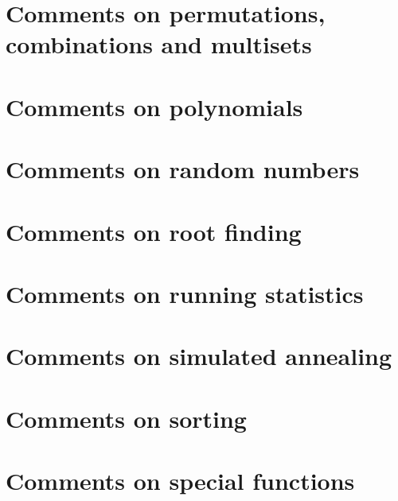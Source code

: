 \documentclass[twoside]{book}
\newcommand{\+}{\discretionary{\mbox{\scriptsize$\hookleftarrow$}}{}{}}
\begin{document}
\chapter{Comments on permutations, combinations and multisets}
\label{Comments_01on_01permutations_00_01combinations_01and_01multisets}
\hypertarget{Comments_01on_01permutations_00_01combinations_01and_01multisets}{}

\chapter{Comments on polynomials}
\label{Comments_01on_01polynomials}
\hypertarget{Comments_01on_01polynomials}{}

\chapter{Comments on random numbers}
\label{Comments_01on_01random_01numbers}
\hypertarget{Comments_01on_01random_01numbers}{}

\chapter{Comments on root finding}
\label{Comments_01on_01root_01finding}
\hypertarget{Comments_01on_01root_01finding}{}

\chapter{Comments on running statistics}
\label{Comments_01on_01running_01statistics}
\hypertarget{Comments_01on_01running_01statistics}{}

\chapter{Comments on simulated annealing}
\label{Comments_01on_01simulated_01annealing}
\hypertarget{Comments_01on_01simulated_01annealing}{}

\chapter{Comments on sorting}
\label{Comments_01on_01sorting}
\hypertarget{Comments_01on_01sorting}{}

\chapter{Comments on special functions}
\label{Comments_01on_01special_01functions}
\hypertarget{Comments_01on_01special_01functions}{}

\end{document}
